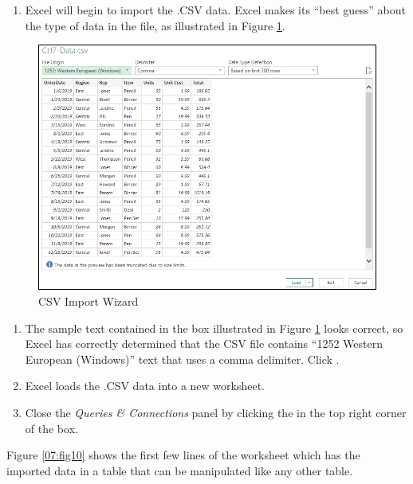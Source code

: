 \begin{enumerate}[resume]
	\item Excel will begin to import the .CSV data. Excel makes its ``best guess'' about the type of data in the file, as illustrated in Figure \ref{07:fig07a}.
\end{enumerate}

\begin{figure}[H]
	\centering
	\includegraphics[width=\maxwidth{.95\linewidth}]{gfx/ch07_fig07a}
	\caption{CSV Import Wizard}
	\label{07:fig07a}
\end{figure}

\begin{enumerate}[resume]
	\item The sample text contained in the box illustrated in Figure \ref{07:fig07a} looks correct, so Excel has correctly determined that the CSV file contains ``1252 Western European (Windows)'' text that uses a comma delimiter. Click .
	\item Excel loads the .CSV data into a new worksheet.
	\item Close the \textit{Queries \& Connections} panel by clicking the  in the top right corner of the box.
\end{enumerate}

Figure \ref{07:fig10} shows the first few lines of the worksheet which has the imported data in a table that can be manipulated like any other table.

